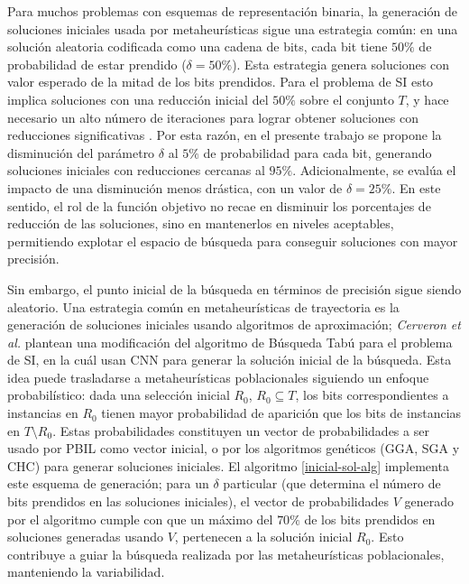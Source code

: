 Para muchos problemas con esquemas de representación binaria, la generación de soluciones iniciales usada por metaheurísticas sigue una estrategia común: en una solución aleatoria codificada como una cadena de bits, cada bit tiene $50\%$ de probabilidad de estar prendido ($\delta = 50\%$). Esta estrategia genera soluciones con valor esperado de la mitad de los bits prendidos. Para el problema de SI esto implica soluciones con una reducción inicial del $50\%$ sobre el conjunto $T$, y hace necesario un alto número de iteraciones para lograr obtener soluciones con reducciones significativas \cite{cano2003using}. Por esta razón, en el presente trabajo se propone la disminución del parámetro $\delta$ al $5\%$ de probabilidad para cada bit, generando soluciones iniciales con reducciones cercanas al $95\%$. Adicionalmente, se evalúa el impacto de una disminución menos drástica, con un valor de $\delta = 25\%$. En este sentido, el rol de la función objetivo no recae en disminuir los porcentajes de reducción de las soluciones, sino en mantenerlos en niveles aceptables, permitiendo explotar el espacio de búsqueda para conseguir soluciones con mayor precisión.

Sin embargo, el punto inicial de la búsqueda en términos de precisión sigue siendo aleatorio. Una estrategia común en metaheurísticas de trayectoria es la generación de soluciones iniciales usando algoritmos de aproximación; \emph{Cerveron et al.} \cite{cerveron2001another} plantean una modificación del algoritmo de Búsqueda Tabú \cite{Glover1986533} para el problema de SI, en la cuál usan CNN para generar la solución inicial de la búsqueda. Esta idea puede trasladarse a metaheurísticas poblacionales siguiendo un enfoque probabilístico: dada una selección inicial $R_0$, $R_0 \subseteq T$, los bits correspondientes a instancias en $R_0$ tienen mayor probabilidad de aparición que los bits de instancias en $T \setminus R_0$. Estas probabilidades constituyen un vector de probabilidades a ser usado por PBIL como vector inicial, o por los algoritmos genéticos (GGA, SGA y CHC) para generar soluciones iniciales. El algoritmo \ref{inicial-sol-alg} implementa este esquema de generación; para un $\delta$ particular (que determina el número de bits prendidos en las soluciones iniciales), el vector de probabilidades $V$ generado por el algoritmo cumple con que un máximo del $70\%$ de los bits prendidos en soluciones generadas usando $V$, pertenecen a la solución inicial $R_0$. Esto contribuye a guiar la búsqueda realizada por las metaheurísticas poblacionales, manteniendo la variabilidad.

